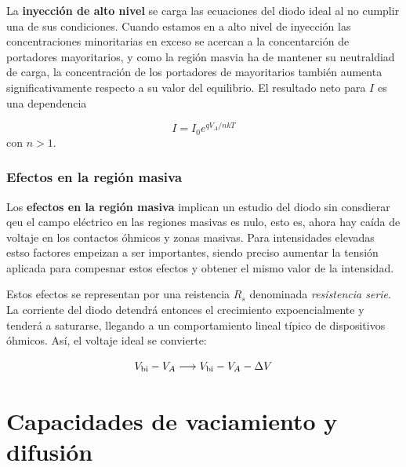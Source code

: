 La \textbf{inyección de alto nivel} se carga las ecuaciones del diodo ideal al no cumplir una de sus condiciones. Cuando estamos en a alto nivel de inyección las concentraciones minoritarias en exceso se acercan a la concentarción de portadores mayoritarios, y como la región masvia ha de mantener su neutraldiad de carga, la concentración de los portadores de mayoritarios también aumenta significativamente respecto a su valor del equilibrio. El resultado neto para $I$ es una dependencia 

\begin{equation}
    I = I_0 e^{qV_A/nkT}
\end{equation}
con $n>1$.

\subsubsection{Efectos en la región masiva}

Los \textbf{efectos en la región masiva} implican un estudio del diodo sin consdierar qeu el campo eléctrico en las regiones masivas es nulo, esto es, ahora hay caída de voltaje en los contactos óhmicos y zonas masivas. Para intensidades elevadas estso factores empeizan a ser importantes, siendo preciso aumentar la tensión aplicada para compesnar estos efectos y obtener el mismo valor de la intensidad. 

Estos efectos se representan por una reistencia $R_s$ denominada \textit{resistencia serie}. La corriente del diodo detendrá entonces el crecimiento expoencialmente y tenderá a saturarse, llegando a un comportamiento lineal típico de dispositivos óhmicos. Así, el voltaje ideal se convierte:

\begin{equation}
    V_{\text{bi}} - V_A \longrightarrow V_{\text{bi}} - V_A - \Delta V
\end{equation}



\section{Capacidades de vaciamiento y difusión}


